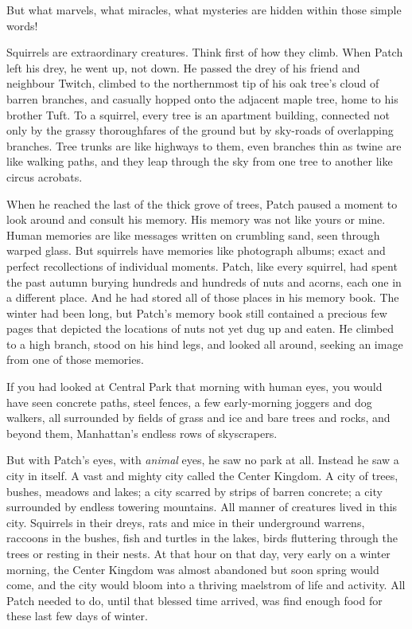 \documentclass[12pt]{book}
\begin{document}
But what marvels, what miracles, what mysteries are hidden within those simple words!

Squirrels are extraordinary creatures. Think first of how they climb. When Patch left his drey, he went up, not down. He passed the drey of his friend and neighbour Twitch, climbed to the northernmost tip of his oak tree's cloud of barren branches, and casually hopped onto the adjacent maple tree, home to his brother Tuft. To a squirrel, every tree is an apartment building, connected not only by the grassy thoroughfares of the ground but by sky-roads of overlapping branches. Tree trunks are like highways to them, even branches thin as twine are like walking paths, and they leap through the sky from one tree to another like circus acrobats.

When he reached the last of the thick grove of trees, Patch paused a moment to look around and consult his memory. His memory was not like yours or mine. Human memories are like messages written on crumbling sand, seen through warped glass. But squirrels have memories like photograph albums; exact and perfect recollections of individual moments. Patch, like every squirrel, had spent the past autumn burying hundreds and hundreds of nuts and acorns, each one in a different place. And he had stored all of those places in his memory book. The winter had been long, but Patch's memory book still contained a precious few pages that depicted the locations of nuts not yet dug up and eaten. He climbed to a high branch, stood on his hind legs, and looked all around, seeking an image from one of those memories.

If you had looked at Central Park that morning with human eyes, you would have seen concrete paths, steel fences, a few early-morning joggers and dog walkers, all surrounded by fields of grass and ice and bare trees and rocks, and beyond them, Manhattan's endless rows of skyscrapers.

But with Patch's eyes, with {\it animal} eyes, he saw no park at all. Instead he saw a city in itself. A vast and mighty city called the Center Kingdom. A city of trees, bushes, meadows and lakes; a city scarred by strips of barren concrete; a city surrounded by endless towering mountains. All manner of creatures lived in this city. Squirrels in their dreys, rats and mice in their underground warrens, raccoons in the bushes, fish and turtles in the lakes, birds fluttering through the trees or resting in their nests. At that hour on that day, very early on a winter morning, the Center Kingdom was almost abandoned %
but soon spring would come, and the city would bloom into a thriving maelstrom of life and activity. All Patch needed to do, until that blessed time arrived, was find enough food for these last few days of winter.
\end{document}
